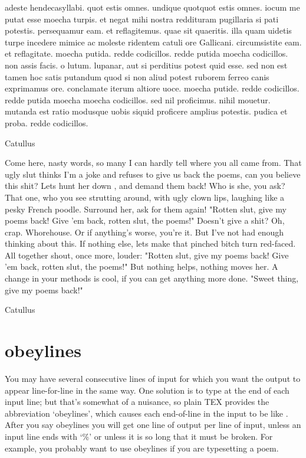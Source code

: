 {\begin{fullwidth}
\begin{minipage}{6.7cm}
{adeste hendecasyllabi. quot estis 
omnes. undique quotquot estis omnes. 
iocum me putat esse moecha turpis. 
et negat mihi nostra reddituram 
pugillaria si pati potestis. 
persequamur eam. et reflagitemus. 
quae sit quaeritis. illa quam uidetis 
turpe incedere mimice ac moleste 
ridentem catuli ore Gallicani. 
circumsistite eam. et reflagitate. 
moecha putida. redde codicillos. 
redde putida moecha codicillos. 
non assis facis. o lutum. lupanar, 
aut si perditius potest quid esse. 
sed non est tamen hoc satis putandum 
quod si non aliud potest ruborem 
ferreo canis exprimamus ore. 
conclamate iterum altiore uoce. 
moecha putide. redde codicillos. 
redde putida moecha moecha codicillos. 
sed nil proficimus. nihil mouetur. 
mutanda est ratio modusque uobis 
siquid proficere amplius potestis. 
pudica et proba. redde codicillos.

\hfil Catullus\par}
\end{minipage}
\hspace{0.8em}
\begin{minipage}{8cm}
{\obeylines
Come here, nasty words, so many I can hardly 
tell where you all came from. 
That ugly slut thinks I'm a joke 
and refuses to give us back 
the poems, can you believe this shit? 
Lets hunt her down , and demand them back! 
Who is she, you ask? That one, who you see 
strutting around, with ugly clown lips, 
laughing like a pesky French poodle. 
Surround her, ask for them again! 
"Rotten slut, give my poems back! 
Give 'em back, rotten slut, the poems!" 
Doesn't give a shit? Oh, crap. Whorehouse. 
Or if anything's worse, you're it. 
But I've not had enough thinking about this. 
If nothing else, lets make that 
pinched bitch turn red-faced. 
All together shout, once more, louder: 
"Rotten slut, give my poems back! 
Give 'em back, rotten slut, the poems!" 
But nothing helps, nothing moves her. 
A change in your methods is cool, 
if you can get anything more done. 
"Sweet thing, give my poems back!"\par

\hfil Catullus\par}
\end{minipage}
\end{fullwidth}

\section{obeylines}
You may have several consecutive lines of input for which you want the output
to appear line-for-line in the same way. One solution is to type  at the
end of each input line; but that's somewhat of a nuisance, so plain TEX provides the
abbreviation `obeylines', which causes each end-of-line in the input to be like .
After you say obeylines you will get one line of output per line of input, unless an
input line ends with `\%' or unless it is so long that it must be broken. For example, you
probably want to use obeylines if you are typesetting a poem. 

}

